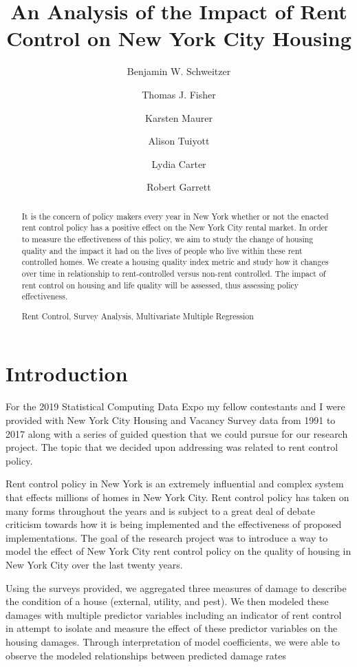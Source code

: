 \documentclass[11pt]{asaproc}\usepackage[]{graphicx}\usepackage[]{color}
\title{An Analysis of the Impact of Rent Control on New York City Housing}
\author{Benjamin W. Schweitzer \and Thomas J. Fisher \and Karsten Maurer \and Alison Tuiyott \and Lydia Carter \and Robert Garrett}
\begin{document}
\maketitle

\begin{abstract}
It is the concern of policy makers every year in New York whether or not the enacted rent control policy has a positive effect on the New York City rental market. In order to measure the effectiveness of this policy, we aim to study the change of housing quality and the impact it had on the lives of people who live within these rent controlled homes. We create a housing quality index metric and study how it changes over time in relationship to rent-controlled versus non-rent controlled. The impact of rent control on housing and life quality will be assessed, thus assessing policy effectiveness.
\begin{keywords}
Rent Control, Survey Analysis, Multivariate Multiple Regression
\end{keywords}
\end{abstract}

\section{Introduction\label{intro}}

For the 2019 Statistical Computing Data Expo my fellow contestants and I were provided with New York City Housing and Vacancy Survey data from 1991 to 2017 along with a series of guided question that we could pursue for our research project. The topic that we decided upon addressing was related to rent control policy.

Rent control policy in New York is an extremely influential and complex system that effects millions of homes in New York City. Rent control policy has taken on many forms throughout the years and is subject to a great deal of debate criticism towards how it is being implemented and the effectiveness of proposed implementations. The goal of the research project was to introduce a way to model the effect of New York City rent control policy on the quality of housing in New York City over the last twenty years.

Using the surveys provided, we aggregated three measures of damage to describe the condition of a house (external, utility, and pest). We then modeled these damages with multiple predictor variables including an indicator of rent control in attempt to isolate and measure the effect of these predictor variables on the housing damages. Through interpretation of model coefficients, we were able to observe the modeled relationships between predicted damage rates 
\end{document}
